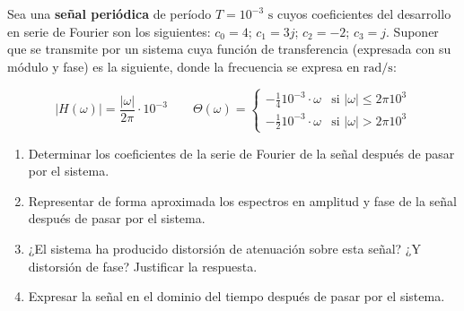 \newpage
\begin{problema}
Sea una \textbf{señal periódica} de período $T = 10^{-3}\text{ s}$ cuyos coeficientes del desarrollo en serie de Fourier son los siguientes: $c_0 = 4$; $c_1 = 3j$; $c_2 = -2$; $c_3 = j$. Suponer que se transmite por un sistema cuya función de transferencia (expresada con su módulo y fase) es la siguiente, donde la frecuencia se expresa en $\text{rad/s}$:

\[\vert{}H(\omega)\vert{} = \frac{\vert{}\omega\vert{}}{2\pi} \cdot 10^{-3} \qquad \Theta(\omega) = \begin{cases} -\frac{1}{4} 10^{-3} \cdot \omega & \text{si } \vert{}\omega\vert{} \le 2\pi 10^3 \\ -\frac{1}{2} 10^{-3} \cdot \omega & \text{si } \vert{}\omega\vert{} > 2\pi 10^3 \end{cases}\]

\begin{enumerate}[label=\alph*)]
    \item Determinar los coeficientes de la serie de Fourier de la señal después de pasar por el sistema.
    \item Representar de forma aproximada los espectros en amplitud y fase de la señal después de pasar por el sistema.
    \item ¿El sistema ha producido distorsión de atenuación sobre esta señal? ¿Y distorsión de fase? Justificar la respuesta.
    \item Expresar la señal en el dominio del tiempo después de pasar por el sistema.
\end{enumerate}
\end{problema}

